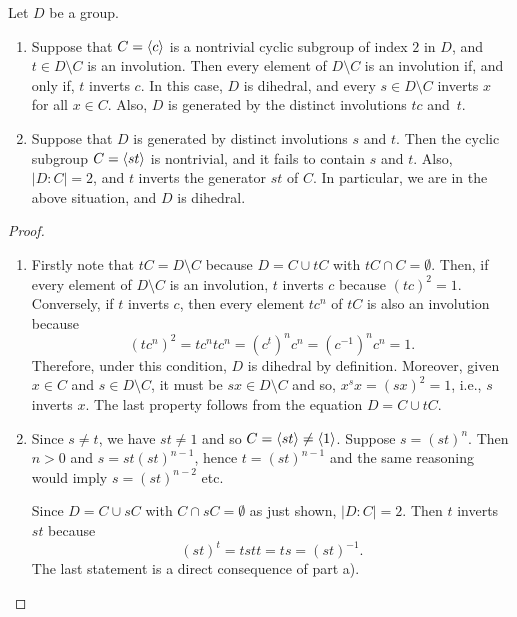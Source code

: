 \begin{lem}\label{dihedral-lemma}
    Let $D$ be a group.
    \begin{enumerate}[\rm a)]
        \item Suppose that\/ $C = \langle c\rangle$ is a nontrivial cyclic subgroup of index\/ $2$ in\/ $D$, and\/ $t \in D\setminus C$ is an involution. Then every element of\/ $D\setminus C$ is an involution if, and only if, $t$ inverts $c$. In this case, $D$ is dihedral, and every $s\in D\setminus C$ inverts $x$ for all $x \in C$. Also, $D$ is generated by the distinct involutions $tc$ and~$t$.
        
        \item Suppose that\/ $D$ is generated by distinct involutions\/ $s$ and\/ $t$. Then the cyclic subgroup\/ $C = \langle st\rangle$ is nontrivial, and it fails to contain\/ $s$ and\/ $t$. Also, $|D:C| = 2$, and\/ $t$ inverts the generator\/ $st$ of\/ $C$. In particular, we are in the above situation, and\/ $D$ is dihedral.
    \end{enumerate}
\end{lem}

\begin{proof}${}$

\begin{enumerate}[\rm a)]
    \item Firstly note that $tC=D\setminus C$ because $D=C\cup tC$ with $tC\cap C=\emptyset$. Then, if every element of $D\setminus C$ is an involution, $t$ inverts $c$ because $(tc)^2=1$. Conversely, if $t$ inverts $c$, then every element $tc^n$ of $tC$ is also an involution because
    $$
        (tc^n)^2=tc^ntc^n=(c^t)^nc^n=(c^{-1})^nc^n=1.
    $$
    Therefore, under this condition, $D$ is dihedral by definition. Moreover, given $x\in C$ and $s\in D\setminus C$, it must be $sx\in D\setminus C$ and so, $x^sx=(sx)^2=1$, i.e., $s$ inverts $x$. The last property follows from the equation $D=C\cup tC$.

    \item Since $s\ne t$, we have $st\ne1$ and so $C=\langle st\rangle\ne\langle1\rangle$. Suppose $s=(st)^n$. Then $n>0$ and $s=st(st)^{n-1}$, hence $t=(st)^{n-1}$ and the same reasoning would imply $s=(st)^{n-2}$ etc.

    Since $D=C\cup sC$ with $C\cap sC=\emptyset$ as just shown, $|D:C|=2$. Then $t$ inverts $st$ because
    $$
        (st)^t=tstt=ts=(st)^{-1}.
    $$
    The last statement is a direct consequence of part a).
\end{enumerate}
\end{proof}

